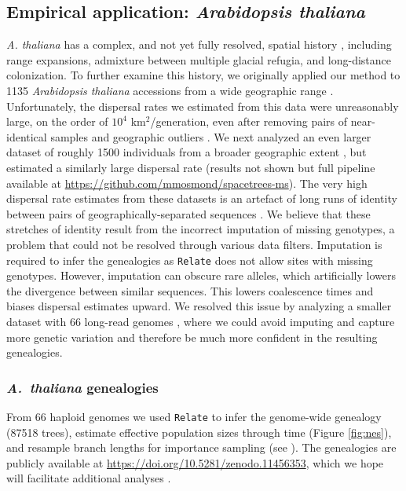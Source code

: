 \documentclass[12pt]{article}
\begin{document}
\subsection*{Empirical application: \textit{Arabidopsis thaliana}}

\textit{A. thaliana} has a complex, and not yet fully resolved, spatial history \citep{fulgione2018archaic,hsu2019postglacial}, including range expansions, admixture between multiple glacial refugia, and long-distance colonization. To further examine this history, we originally applied our method to 1135 \textit{Arabidopsis thaliana} accessions from a wide geographic range \citep{alonso2016}. Unfortunately, the dispersal rates we estimated from this data were unreasonably large, on the order of $10^4$ km$^2$/generation, even after removing pairs of near-identical samples and geographic outliers \citep[for more details see our preprint,][]{osmondcoop2021}. We next analyzed an even larger dataset of roughly 1500 individuals from a broader geographic extent \citep{durvasula2017african}, but estimated a similarly large dispersal rate (results not shown but full pipeline available at \url{https://github.com/mmosmond/spacetrees-ms}). The very high dispersal rate estimates from these datasets is an artefact of long runs of identity between pairs of geographically-separated sequences \citep[see Figure S6 of][]{osmondcoop2021}. We believe that these stretches of identity result from the incorrect imputation of missing genotypes, a problem that could not be resolved through various data filters. Imputation is required to infer the genealogies as \texttt{Relate} does not allow sites with missing genotypes. However, imputation can obscure rare alleles, which artificially lowers the divergence between similar sequences. This lowers coalescence times and biases dispersal estimates upward. We resolved this issue by analyzing a smaller dataset with 66 long-read genomes \citep{wlodzimierz2023cycles}, where we could avoid imputing and capture more genetic variation \citep{igolkina2024towards} and therefore be much more confident in the resulting genealogies. 

\subsubsection*{\textit{A.\ thaliana} genealogies}

From 66 haploid genomes we used \texttt{Relate} \citep{speidel2019method} to infer the genome-wide genealogy (87518 trees), estimate effective population sizes through time (Figure \ref{fig:nes}), and resample branch lengths for importance sampling (see ). The genealogies are publicly available at \url{https://doi.org/10.5281/zenodo.11456353}, which we hope will facilitate additional analyses \citep[e.g., inferring selection;][]{stern2019approximate,stern2020disentangling}.
\end{document}
